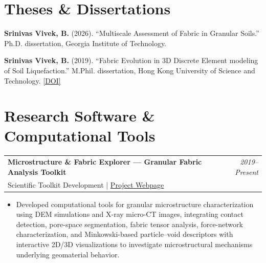 \documentclass[10pt,letterpaper]{article}
\makeatletter
\newcommand{\entry}[3]{%
  \begin{tabularx}{\textwidth}{@{}X r@{}}
    \textbf{#1} & \textit{#3}\\[-1pt]
    \textcolor{midgray}{#2} &
  \end{tabularx}\vspace{-1pt}
}
\newcommand{\pub}[2]{%
    \item \hypertarget{pub:#1}{}#2
}
\makeatother
\begin{document}
\section{Theses \& Dissertations}
\begin{enumerate}[resume, label={[\arabic*]}, leftmargin=*, itemsep=0pt]

\pub{19}{\textbf{Srinivas Vivek, B.} (2026).
``Multiscale Assessment of Fabric in Granular Soils.''
Ph.D. dissertation, Georgia Institute of Technology.}

\pub{20}{\textbf{Srinivas Vivek, B.} (2019).
``Fabric Evolution in 3D Discrete Element modeling of
Soil Liquefaction.''
M.Phil. dissertation, Hong Kong University of Science
and Technology. \href{https://doi.org/10.14711/thesis-991012752454703412}{[DOI]}}

\end{enumerate}


\section{Research Software \& Computational Tools}

\entry{Microstructure \& Fabric Explorer ---
Granular Fabric Analysis Toolkit}
{Scientific Toolkit Development |
\href{https://srinivas12viv.github.io/microstructure-fabric-explorer/}
{Project Webpage}}
{2019--Present}
\begin{itemize}
    \item Developed computational tools for granular
    microstructure characterization using DEM simulations
    and X-ray micro-CT images, integrating contact detection,
    pore-space segmentation, fabric tensor analysis,
    force-network characterization, and Minkowski-based
    particle--void descriptors with interactive 2D/3D
    visualizations to investigate microstructural
    mechanisms underlying geomaterial behavior.
\end{itemize}
\end{document}
